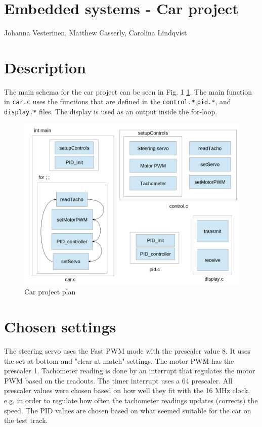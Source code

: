 \documentclass[11pt,a4paper]{report}
\begin{document}
\section*{Embedded systems - Car project}
Johanna Vesterinen, Matthew Casserly, Carolina Lindqvist\\

\section*{Description}
The main schema for the car project can be seen in Fig. 1 \ref{car}. The main function in \verb|car.c| uses the functions that are defined in the \verb|control.*|,\verb|pid.*|, and \verb|display.*| files. The display is used as an output inside the for-loop.

\begin{figure}[h!]
\label{car}
\includegraphics[scale=0.45]{car-schema.png}
\caption{Car project plan}
\end{figure}

\section*{Chosen settings}
The steering servo uses the Fast PWM mode with the prescaler value 8. It uses the set at bottom and "clear at match" settings. 
The motor PWM has the prescaler 1. Tachometer reading is done by an interrupt that regulates the motor PWM based on the readouts. The timer interrupt uses a \/64 prescaler. All prescaler values were chosen based on how well they fit with the 16 MHz clock, e.g. in order to regulate how often the tachometer readings updates (corrects) the speed. The PID values are chosen based on what seemed suitable for the car on the test track.
\end{document}
